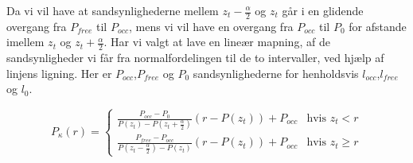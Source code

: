 Da vi vil have at sandsynlighederne mellem $z_t-\frac{\alpha}{2}$ og $z_t$ går i en glidende overgang fra $P_{free}$ til $P_{occ}$,
mens vi vil have en overgang fra $P_{occ}$ til ${P_0}$ for afstande imellem $z_t$ og $z_t+\frac{\alpha}{2}$.
Har vi valgt at lave en lineær mapning, af de sandsynligheder vi får fra normalfordelingen til de to intervaller, ved hjælp af linjens ligning.
Her er $P_{occ}$,$P_{free}$ og $P_0$ sandsynlighederne for henholdsvis $l_{occ}$,$l_{free}$ og $l_0$.


\begin{equation}
	P_\kappa(r) = \begin{cases}
		\frac{P_{occ}-P_0}{P(z_t)-P(z_t+\frac{\alpha}{2})}(r-P(z_t))+P_{occ} &\text{hvis } z_t < r \\
		\frac{P_{free}-P_{occ}}{P(z_t-\frac{\alpha}{2})-P(z_t)}(r-P(z_t))+P_{occ} &\text{hvis } z_t \geq r 
	\end{cases}
\end{equation}








